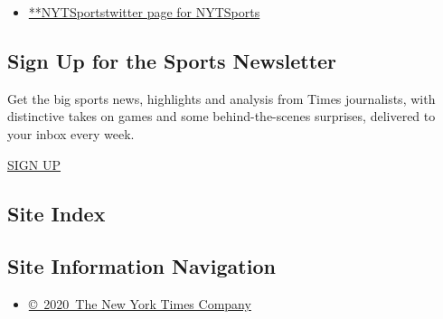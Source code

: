 \begin{itemize}
\tightlist
\item
  \href{https://twitter.com/NYTSports}{**NYTSportstwitter page for
  NYTSports}
\end{itemize}

\hypertarget{sign-up-for-the-sports-newsletter}{%
\subsection{Sign Up for the Sports
Newsletter}\label{sign-up-for-the-sports-newsletter}}

Get the big sports news, highlights and analysis from Times journalists,
with distinctive takes on games and some behind-the-scenes surprises,
delivered to your inbox every week.

\href{/newsletters/signup/SP}{SIGN UP}

\hypertarget{site-index}{%
\subsection{Site Index}\label{site-index}}

\hypertarget{site-information-navigation}{%
\subsection{Site Information
Navigation}\label{site-information-navigation}}

\begin{itemize}
\tightlist
\item
  \href{https://help.nytimes3xbfgragh.onion/hc/en-us/articles/115014792127-Copyright-notice}{©~2020~The
  New York Times Company}
\end{itemize}

